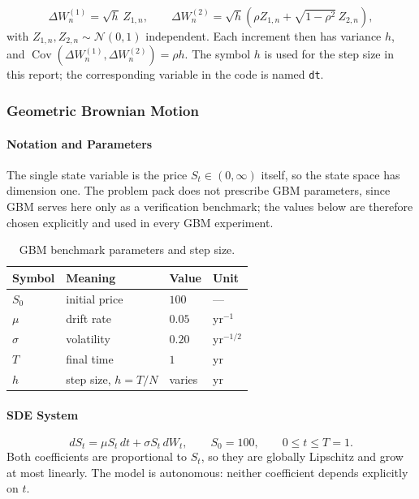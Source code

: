\documentclass[11pt,a4paper]{article}
\theoremstyle{definition}
\theoremstyle{remark}
\begin{document}
\begin{equation}
    \Delta W_n^{(1)} = \sqrt{h}\, Z_{1,n},
    \qquad
    \Delta W_n^{(2)} = \sqrt{h}\left( \rho Z_{1,n} + \sqrt{1 - \rho^2}\, Z_{2,n} \right),
    \label{eq:increments}
\end{equation}
with $Z_{1,n}, Z_{2,n} \sim \mathcal{N}(0, 1)$ independent. Each increment then has variance $h$, and $\operatorname{Cov}\!\left( \Delta W_n^{(1)}, \Delta W_n^{(2)} \right) = \rho h$. The symbol $h$ is used for the step size in this report; the corresponding variable in the code is named \texttt{dt}.
\subsubsection{Geometric Brownian Motion}
\label{sec:gbm-model}
\paragraph{Notation and Parameters}
The single state variable is the price $S_t \in (0, \infty)$ itself, so the state space has dimension one. The problem pack does not prescribe GBM parameters, since GBM serves here only as a verification benchmark; the values below are therefore chosen explicitly and used in every GBM experiment.
\begin{table}[H]
\centering
\begin{tabular}{llll}
\toprule
\textbf{Symbol} & \textbf{Meaning} & \textbf{Value} & \textbf{Unit} \\
\midrule
$S_0$    & initial price        & $100$   & --- \\
$\mu$    & drift rate           & $0.05$  & yr$^{-1}$ \\
$\sigma$ & volatility           & $0.20$  & yr$^{-1/2}$ \\
$T$      & final time           & $1$     & yr \\
$h$      & step size, $h = T/N$ & varies  & yr \\
\bottomrule
\end{tabular}
\caption{GBM benchmark parameters and step size.}
\label{tab:gbm-params}
\end{table}
\paragraph{SDE System}
\begin{equation}
    dS_t = \mu S_t\, dt + \sigma S_t\, dW_t,
    \qquad S_0 = 100,
    \qquad 0 \le t \le T = 1 .
    \label{eq:gbm-model}
\end{equation}
Both coefficients are proportional to $S_t$, so they are globally Lipschitz and grow at most linearly. The model is autonomous: neither coefficient depends explicitly on $t$.
\end{document}

